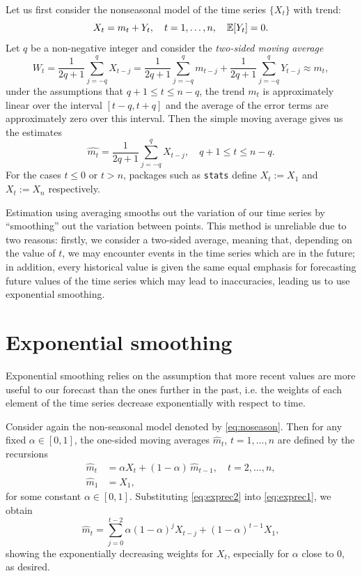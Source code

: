 \documentclass[a4paper, oneside]{discothesis}
\begin{document}
Let us first consider the nonseasonal model of the time series $\{X_t\}$ with trend:
\begin{equation}\label{eq:noseason}
    X_t = m_t + Y_t, \quad t = 1, \dots, n, \quad  \operatorname{\mathbb{E}}[Y_t] = 0.
\end{equation}
Let $q$ be a non-negative integer and consider the \textit{two-sided moving average}
\begin{equation*}
    W_t = \frac{1}{2q + 1} \sum_{j=-q}^q X_{t-j} = \frac{1}{2q + 1} \sum_{j=-q}^q m_{t-j} + \frac{1}{2q + 1} \sum_{j=-q}^q Y_{t-j} \approx m_t,
\end{equation*}
under the assumptions that $q+1 \leq t \leq n-q$, the trend $m_t$ is approximately linear over the interval $[t-q, t+q]$ and the average of the error terms are approximately zero over this interval. Then the simple moving average gives us the estimates
\begin{equation*}
    \hat{m_t} = \frac{1}{2q + 1} \sum_{j=-q}^q X_{t-j}, \quad q+1 \leq t \leq n-q.
\end{equation*}
For the cases $t \leq 0$ or $t > n$, packages such as \texttt{stats} define $X_t := X_1$ and $X_t := X_n$ respectively.

Estimation using averaging smooths out the variation of our time series by ``smoothing'' out the variation between points. This method is unreliable due to two reasons: firstly, we consider a two-sided average, meaning that, depending on the value of $t$, we may encounter events in the time series which are in the future; in addition, every historical value is given the same equal emphasis for forecasting future values of the time series which may lead to inaccuracies, leading us to use exponential smoothing.

\section{Exponential smoothing}
Exponential smoothing relies on the assumption that more recent values are more useful to our forecast than the ones further in the past, i.e. the weights of each element of the time series decrease exponentially with respect to time.

Consider again the non-seasonal model denoted by \eqref{eq:noseason}. Then for any fixed $\alpha \in [0, 1]$, the one-sided moving averages $\hat{m}_t$, $t = 1, \dots, n$ are defined by the recursions
    \begin{align}
        \label{eq:exprec1}\hat{m}_t &= \alpha X_t + (1-\alpha) \, \hat{m}_{t-1}, \quad t = 2, \dots, n, \\
        \label{eq:exprec2} \hat{m}_1 &= X_1,
    \end{align}
for some constant $\alpha \in [0,1]$. Substituting \eqref{eq:exprec2} into \eqref{eq:exprec1}, we obtain
    \begin{equation*}
        \hat{m}_t = \sum_{j=0}^{t-2} \alpha (1-\alpha)^j X_{t-j} + (1-\alpha)^{t-1}X_1,
    \end{equation*}
showing the exponentially decreasing weights for $X_t$, especially for $\alpha$ close to $0$, as desired.
\end{document}
